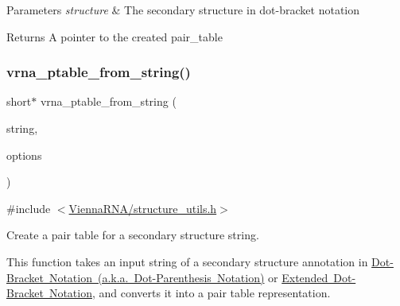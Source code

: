 \begin{DoxyParams}{Parameters}
{\em structure} & The secondary structure in dot-\/bracket notation \\
\hline
\end{DoxyParams}
\begin{DoxyReturn}{Returns}
A pointer to the created pair\+\_\+table 
\end{DoxyReturn}
\mbox{\label{group__struct__utils_gac76c9ef3de507748fb0416a59323362b}} 
\subsubsection{\texorpdfstring{vrna\+\_\+ptable\+\_\+from\+\_\+string()}{vrna\_ptable\_from\_string()}}
{\footnotesize\ttfamily short$\ast$ vrna\+\_\+ptable\+\_\+from\+\_\+string (\begin{DoxyParamCaption}\item[{const char $\ast$}]{string,  }\item[{unsigned int}]{options }\end{DoxyParamCaption})}



{\ttfamily \#include $<$\mbox{\hyperlink{structure__utils_8h}{Vienna\+R\+N\+A/structure\+\_\+utils.\+h}}$>$}



Create a pair table for a secondary structure string. 

This function takes an input string of a secondary structure annotation in \mbox{\hyperlink{rna_structure_notations_dot-bracket-notation}{Dot-\/\+Bracket Notation (a.\+k.\+a. Dot-\/\+Parenthesis Notation)}} or \mbox{\hyperlink{rna_structure_notations_dot-bracket-ext-notation}{Extended Dot-\/\+Bracket Notation}}, and converts it into a pair table representation.


